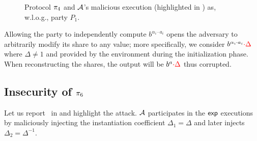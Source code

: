 \documentclass[a4paper,10pt]{article}
\begin{document}
\begin{figure}[!ht]
    \centering
    \begin{pchstack}
      \pchspace
    \end{pchstack}
    \caption{Protocol $\pi_{4}$ and $\mathcal{A}$'s malicious execution (highlighted in )
      as, w.l.o.g., party $P_1$.}\label{fig:proto4}
\end{figure}


Allowing the party to independently compute $b^{\alpha_i \cdot a_i}$ opens the adversary
to arbitrarily modify its share to any value; more specifically, we consider
$b^{\alpha_i \cdot a_i} \textcolor{red}{\cdot \Delta}$ where $\Delta \neq 1$ and provided by the environment during
the initialization phase.
When reconstructing the shares, the output will be $b^{a} \textcolor{red}{\cdot \Delta}$ thus corrupted.

\subsection{Insecurity of $\pi_{6}$}

Let us report \ in  and highlight the attack.
$\mathcal{A}$ participates in the $\textsf{exp}$ executions by maliciously injecting the instantiation
coefficient $\Delta_1 = \Delta$ and later injects $\Delta_2 = \Delta^{-1}$.
\end{document}

